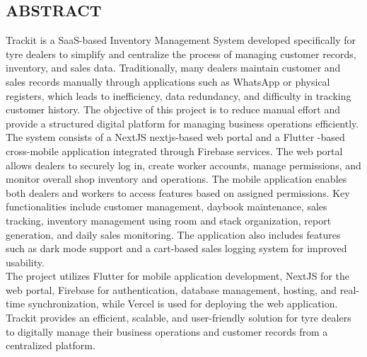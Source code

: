 \documentclass[12pt, oneside]{article}
\begin{document}
\newpage
\begin{center}
    \section*{ABSTRACT}
\end{center}
\doublespacing
Trackit is a SaaS-based Inventory Management System developed specifically for tyre dealers to simplify and centralize the process of managing customer records, inventory, and sales data. Traditionally, many dealers maintain customer and sales records manually through applications such as WhatsApp or physical registers, which leads to inefficiency, data redundancy, and difficulty in tracking customer history. The objective of this project is to reduce manual effort and provide a structured digital platform for managing business operations efficiently.\\[0.25cm]
The system consists of a NextJS {nextjs}-based web portal and a Flutter \cite{flutter}-based cross-\citeplatform mobile application integrated through Firebase \cite{firebase} services. The web portal allows dealers to securely log in, create worker accounts, manage permissions, and monitor overall shop inventory and operations. The mobile application enables both dealers and workers to access features based on assigned permissions. Key functionalities include customer management, daybook maintenance, sales tracking, inventory management using room and stack organization, report generation, and daily sales monitoring. The application also includes features such as dark mode support and a cart-based sales logging system for improved usability.\\[0.25cm]
The project utilizes Flutter for mobile application development, NextJS for the web portal, Firebase for authentication, database management, hosting, and real-time synchronization, while Vercel \cite{vercel} is used for deploying the web application. Trackit provides an efficient, scalable, and user-friendly solution for tyre dealers to digitally manage their business operations and customer records from a centralized platform.
\end{document}
